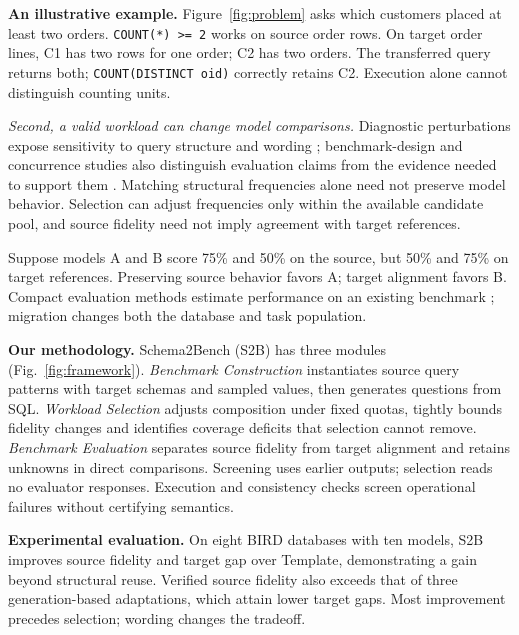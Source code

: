 \textbf{An illustrative example.} Figure~\ref{fig:problem} asks which customers placed at least two orders. \texttt{COUNT(*) >= 2} works on source order rows. On target order lines, C1 has two rows for one order; C2 has two orders. The transferred query returns both; \texttt{COUNT(DISTINCT oid)} correctly retains C2. Execution alone cannot distinguish counting units.

\emph{Second, a valid workload can change model comparisons.} Diagnostic perturbations expose sensitivity to query structure and wording \citep{malekpour2026sqlmorph,chang2023drspider}; benchmark-design and concurrence studies also distinguish evaluation claims from the evidence needed to support them \citep{liu2024ecbd,sun2023concurrence}. Matching structural frequencies alone need not preserve model behavior. Selection can adjust frequencies only within the available candidate pool, and source fidelity need not imply agreement with target references.

Suppose models A and B score 75\% and 50\% on the source, but 50\% and 75\% on target references. Preserving source behavior favors A; target alignment favors B. Compact evaluation methods estimate performance on an existing benchmark \citep{maiapolo2024tiny}; migration changes both the database and task population.

\textbf{Our methodology.} Schema2Bench (S2B) has three modules (Fig.~\ref{fig:framework}). \emph{Benchmark Construction} instantiates source query patterns with target schemas and sampled values, then generates questions from SQL. \emph{Workload Selection} adjusts composition under fixed quotas, tightly bounds fidelity changes and identifies coverage deficits that selection cannot remove. \emph{Benchmark Evaluation} separates source fidelity from target alignment and retains unknowns in direct comparisons. Screening uses earlier outputs; selection reads no evaluator responses. Execution and consistency checks screen operational failures without certifying semantics.

\textbf{Experimental evaluation.} On eight BIRD databases with ten models, S2B improves source fidelity and target gap over Template, demonstrating a gain beyond structural reuse. Verified source fidelity also exceeds that of three generation-based adaptations, which attain lower target gaps. Most improvement precedes selection; wording changes the tradeoff.

